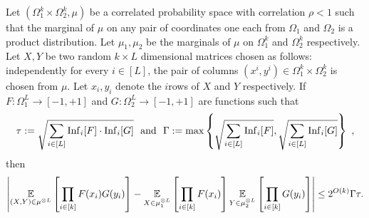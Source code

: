 \begin{theorem}

  \label{thm:inv-prin} Let $(\Omega_1^k \times \Omega_2^k, \mu)$ be a
  correlated probability space with correlation $\rho < 1$
   such that the marginal of $\mu$ on any
  pair of coordinates one each from $\Omega_1$ and $\Omega_2$ is a
  product distribution. Let $\mu_1 ,\mu_2$ be the marginals of $\mu$
  on $\Omega_1^k$ and $\Omega_2^k$ respectively. Let $X, Y$ be two
  random $k\times L$ dimensional matrices chosen as follows:
  independently for every $i \in [L]$, the pair of columns $(x^i,y^i)
  \in \Omega_1^k \times \Omega_2^k$ is chosen from $\mu$. Let
  $x_i,y_i$ denote the $i$\th rows of $X$ and $Y$ respectively.  If
  $F: \Omega_1^L \rightarrow [-1,+1]$ and $G: \Omega_2^L \rightarrow
  [-1,+1]$ are functions such that
	$$\tau:= \sqrt{\sum_{i \in [L]}\mbox{\textnormal{Inf}}_i[F]\cdot \mbox{\textnormal{Inf}}_i[G]}  ~\text{ and } ~
	\Gamma := \max \left\{ \sqrt{\sum_{i \in [L]}\mbox{\textnormal{Inf}}_i[F]} , \sqrt{\sum_{i \in 
	[L]}\mbox{\textnormal{Inf}}_i[G]} \right\} \ ,$$ then
		\begin{equation}
		\label{eqn:inv-eqn}
		\left|  \operatorname*{\mathbb E}_{(X,Y) \in \mu^{\otimes L}} \left[\prod_{i\in [k]}F(x_i) G(y_i)
		\right] - \operatorname*{\mathbb E}_{X \in \mu_1^{\otimes L}} \left[\prod_{i\in [k]}F(x_i)\right]
		\operatorname*{\mathbb E}_{Y \in \mu_2^{\otimes L}} \left[\prod_{i\in [k]}G(y_i)\right]  \right| \leq 
		2^{O(k)} \Gamma \tau.
	\end{equation}
\end{theorem}

